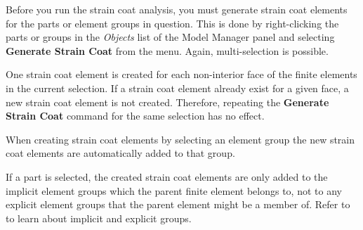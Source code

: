 Before you run the strain coat analysis, \newline you must generate
strain coat elements for \newline the parts or element groups in question.
This is done by right-clicking the
parts or groups in the {\sl Objects} list of the Model Manager panel
and selecting \textbf{Generate Strain Coat} from the menu.
Again, multi-selection is possible.

One strain coat element is created for \newline each non-interior face of the
finite elements \newline in the current selection.
If a strain coat element already exist for a given face,
a new strain coat element is not created.
Therefore, repeating the \textbf{Generate Strain Coat} command for
the same selection has no effect.

When creating strain coat elements by selecting an element group the new
strain coat elements are automatically added to that group.

If a part is selected, the created strain coat elements are only added to the
implicit element groups which the parent finite element belongs to, not to any
explicit element groups that the parent element might be a member of.
Refer to 
to learn about implicit and explicit groups.





